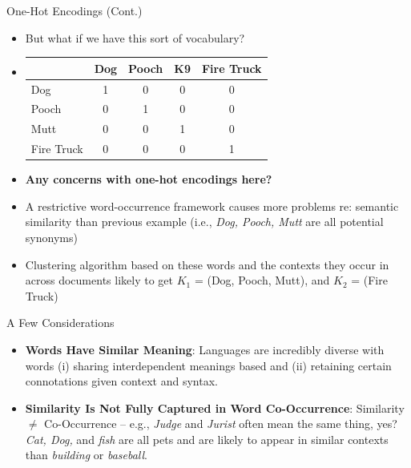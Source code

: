 \documentclass[
  ignorenonframetext,
  aspectratio=169]{beamer}
\begin{document}
\begin{frame}{One-Hot Encodings (Cont.)}
\label{one-hot-encodings-cont.-1}
\begin{itemize}
\item But what if we have this sort of vocabulary? \par \vspace{2.5mm} 
\item[] \begin{tabular}{lcccc}
\toprule
 & Dog & Pooch & K9 & Fire Truck \\
\midrule
Dog         & 1 & 0 & 0 & 0 \\
Pooch       & 0 & 1 & 0 & 0 \\
Mutt          & 0 & 0 & 1 & 0 \\
Fire Truck  & 0 & 0 & 0 & 1 \\
\bottomrule
\end{tabular} \par \vspace{2.5mm}  \pause 
\item \textbf{Any concerns with one-hot encodings here?} \par \vspace{2.5mm}  \pause 
\item A restrictive word-occurrence framework causes more problems re: semantic similarity than previous example (i.e., \textit{Dog, Pooch, Mutt} are all potential synonyms) \par \vspace{2.5mm} 
\item Clustering algorithm based on these words and the contexts they occur in across documents likely to get $K_{1}$ = (Dog, Pooch, Mutt), and $K_2$ = (Fire Truck)
\end{itemize}
\end{frame}

\begin{frame}{A Few Considerations}
\label{a-few-considerations}
\begin{itemize}
\item \textbf{Words Have Similar Meaning}: Languages are incredibly diverse with words (i) sharing interdependent meanings based and (ii) retaining certain connotations given context and syntax. 
\par \vspace{2.5mm} \pause 
\item \textbf{Similarity Is Not Fully Captured in Word Co-Occurrence}: Similarity $\neq$ Co-Occurrence -- e.g., \textit{Judge} and \textit{Jurist} often mean the same thing, yes? \textit{Cat, Dog, } and \textit{fish} are all pets and are likely to appear in similar contexts than \textit{building} or \textit{baseball}. 
\end{itemize}
\end{frame}
\end{document}
